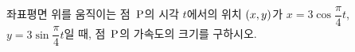 좌표평면 위를 움직이는 점~$\mathrm{P}$의 시각 $t$에서의 위치 $(x{,}\mkern3mu\mathopen{}y)$가 $x=3\cos\dfrac{\pi}{4}t$, $y=3\sin\dfrac{\pi}{4}t$일 때, 점~$\mathrm{P}$의 가속도의 크기를 구하시오.

